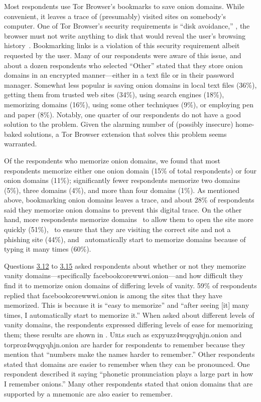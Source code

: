 Most respondents use Tor Browser's bookmarks to save onion domains.  While
convenient, it leaves a trace of (presumably) visited sites on somebody's
computer.  One of Tor Browser's security requirements is ``disk avoidance,''
\ie, the browser must not write anything to disk that would reveal the user's
browsing history~\cite[\S~2.1]{Perry2017a}.  Bookmarking links is a violation of
this security requirement albeit requested by the user.  Many of our respondents
were aware of this issue, and about a dozen respondents who selected ``Other''
stated that they store onion domains in an encrypted manner---either in a text
file or in their password manager.  Somewhat less popular is saving onion
domains in local text files (36\%), getting them from trusted web sites (34\%),
using search engines (18\%), memorizing domains (16\%), using some other
techniques (9\%), or employing pen and paper (8\%).  Notably, one quarter of our
respondents do not have a good solution to the problem.  Given the alarming
number of (possibly insecure) home-baked solutions, a Tor Browser extension that
solves this problem seems warranted.

Of the respondents who memorize onion domains, we found that most respondents
memorize either one onion domain (15\% of total respondents) or four onion
domains (11\%); significantly fewer respondents memorize two domains (5\%),
three domains (4\%), and more than four domains (1\%).  As mentioned above,
bookmarking onion domains leaves a trace, and about 28\% of respondents said
they memorize onion domains to prevent this digital trace.  On the other hand,
more respondents memorize domains \first~to allow them to open the site more
quickly (51\%), \second~to ensure that they are visiting the correct site and
not a phishing site (44\%), and \third~automatically start to memorize domains
because of typing it many times (60\%).

Questions \hyperref[q3_12]{3.12} to \hyperref[q3_15]{3.15} asked respondents
about whether or not they memorize vanity domains---specifically
facebookcorewwwi.onion---and how difficult they find it to memorize onion
domains of differing levels of vanity.  59\% of respondents replied that
facebookcorewwwi.onion is among the sites that they have memorized.  This is
because it is ``easy to memorize'' and ``after seeing [it] many times, I
automatically start to memorize it.''  When asked about different levels of
vanity domains, the respondents expressed differing levels of ease for
memorizing them; these results are shown in .
\textsc{Url}s such as expyuzz4wqqyqhjn.onion and torproz4wqqyqhjn.onion are
harder for respondents to remember because they mention that ``numbers make the
names harder to remember.''  Other respondents stated that domains are easier to
remember when they can be pronounced.  One respondent described it saying
``phonetic pronunciation plays a large part in how I remember onions.'' Many
other respondents stated that onion domains that are supported by a mnemonic are
also easier to remember.  

